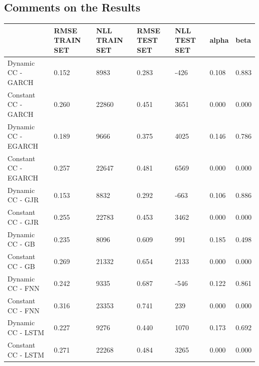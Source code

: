 \documentclass[a4paper, oneside]{discothesis}
\begin{document}
\subsection{Comments on the Results}
\begin{table}[!ht]\label{tbl_md_1}
    \scriptsize
    \centering
    \begin{tabular}{|p{3.5cm}||p{1.1cm}|p{1.1cm}|p{1.1cm}|p{1.1cm}||p{1.1cm}|p{1.1cm}|}
    \hline
     & RMSE TRAIN SET & NLL TRAIN SET & RMSE TEST SET & NLL TEST SET & alpha & beta \\ \hline\hline
        Dynamic CC - GARCH & 0.152 & 8983 & 0.283 & -426 & 0.108 & 0.883 \\ \hline
        Constant CC - GARCH & 0.260 & 22860 & 0.451 & 3651 & 0.000 & 0.000 \\ \hline
        Dynamic CC - EGARCH & 0.189 & 9666 & 0.375 & 4025 & 0.146 & 0.786 \\ \hline
        Constant CC - EGARCH & 0.257 & 22647 & 0.481 & 6569 & 0.000 & 0.000 \\ \hline
        Dynamic CC - GJR & 0.153 & 8832 & 0.292 & -663 & 0.106 & 0.886 \\ \hline
        Constant CC - GJR & 0.255 & 22783 & 0.453 & 3462 & 0.000 & 0.000 \\ \hline
        Dynamic CC - GB & 0.235 & 8096 & 0.609 & 991 & 0.185 & 0.498 \\ \hline
        Constant CC - GB & 0.269 & 21332 & 0.654 & 2133 & 0.000 & 0.000 \\ \hline
        Dynamic CC - FNN & 0.242 & 9335 & 0.687 & -546 & 0.122 & 0.861 \\ \hline
        Constant CC - FNN & 0.316 & 23353 & 0.741 & 239 & 0.000 & 0.000 \\ \hline
        Dynamic CC - LSTM & 0.227 & 9276 & 0.440 & 1070 & 0.173 & 0.692 \\ \hline
        Constant CC - LSTM & 0.271 & 22268 & 0.484 & 3265 & 0.000 & 0.000 \\ \hline
    \end{tabular}
            \normalsize

\end{table}
\end{document}
